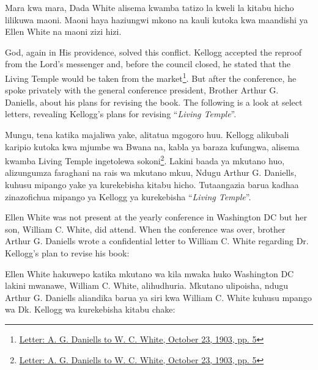 Mara kwa mara, Dada White alisema kwamba tatizo la kweli la kitabu hicho lilikuwa maoni. Maoni haya haziungwi mkono na kauli kutoka kwa maandishi ya Ellen White na maoni zizi hizi.


God, again in His providence, solved this conflict. Kellogg accepted the reproof from the Lord's messenger and, before the council closed, he stated that the Living Temple would be taken from the market\footnote{\href{https://forgottenpillar.com/wp-content/uploads/2022/04/Letter-A-G-Daniells-to-W-C-White-October-29-1903.pdf}{Letter: A. G. Daniells to W. C. White, October 23, 1903, pp. 5}}. But after the conference, he spoke privately with the general conference president, Brother Arthur G. Daniells, about his plans for revising the book. The following is a look at select letters, revealing Kellogg's plans for revising “\textit{Living Temple}”.


Mungu, tena katika majaliwa yake, alitatua mgogoro huu. Kellogg alikubali karipio kutoka kwa mjumbe wa Bwana na, kabla ya baraza kufungwa, alisema kwamba Living Temple ingetolewa sokoni\footnote{\href{https://forgottenpillar.com/wp-content/uploads/2022/04/Letter-A-G-Daniells-to-W-C-White-October-29-1903.pdf}{Letter: A. G. Daniells to W. C. White, October 23, 1903, pp. 5}}. Lakini baada ya mkutano huo, alizungumza faraghani na rais wa mkutano mkuu, Ndugu Arthur G. Daniells, kuhusu mipango yake ya kurekebisha kitabu hicho. Tutaangazia barua kadhaa zinazofichua mipango ya Kellogg ya kurekebisha “\textit{Living Temple}”.


Ellen White was not present at the yearly conference in Washington DC but her son, William C. White, did attend. When the conference was over, brother Arthur G. Daniells wrote a confidential letter to William C. White regarding Dr. Kellogg's plan to revise his book:


Ellen White hakuwepo katika mkutano wa kila mwaka huko Washington DC lakini mwanawe, William C. White, alihudhuria. Mkutano ulipoisha, ndugu Arthur G. Daniells aliandika barua ya siri kwa William C. White kuhusu mpango wa Dk. Kellogg wa kurekebisha kitabu chake:








